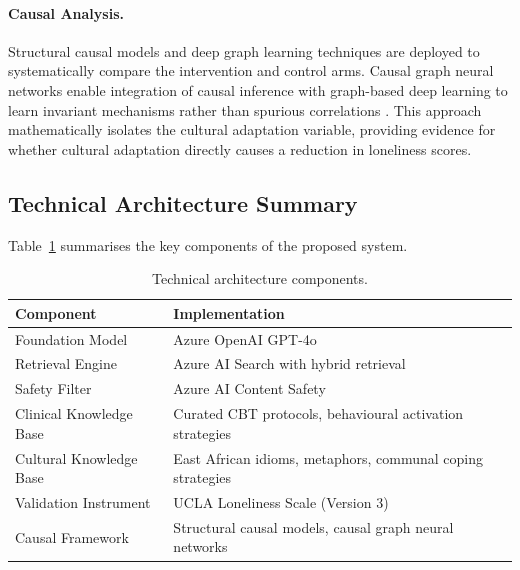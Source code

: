\documentclass[12pt,a4paper]{article}
\begin{document}
\paragraph{Causal Analysis.}
Structural causal models and deep graph learning techniques are deployed to systematically compare the intervention and control arms. Causal graph neural networks enable integration of causal inference with graph-based deep learning to learn invariant mechanisms rather than spurious correlations \citep{Mesinovic2026}. This approach mathematically isolates the cultural adaptation variable, providing evidence for whether cultural adaptation directly causes a reduction in loneliness scores.

\subsection{Technical Architecture Summary}

Table~\ref{tab:architecture} summarises the key components of the proposed system.

\begin{table}[H]
\centering
\caption{Technical architecture components.}
\label{tab:architecture}
\begin{tabularx}{\textwidth}{lX}
\toprule
\textbf{Component} & \textbf{Implementation} \\
\midrule
Foundation Model & Azure OpenAI GPT-4o \\
Retrieval Engine & Azure AI Search with hybrid retrieval \\
Safety Filter & Azure AI Content Safety \\
Clinical Knowledge Base & Curated CBT protocols, behavioural activation strategies \\
Cultural Knowledge Base & East African idioms, metaphors, communal coping strategies \\
Validation Instrument & UCLA Loneliness Scale (Version 3) \\
Causal Framework & Structural causal models, causal graph neural networks \\
\bottomrule
\end{tabularx}
\end{table}
\end{document}
